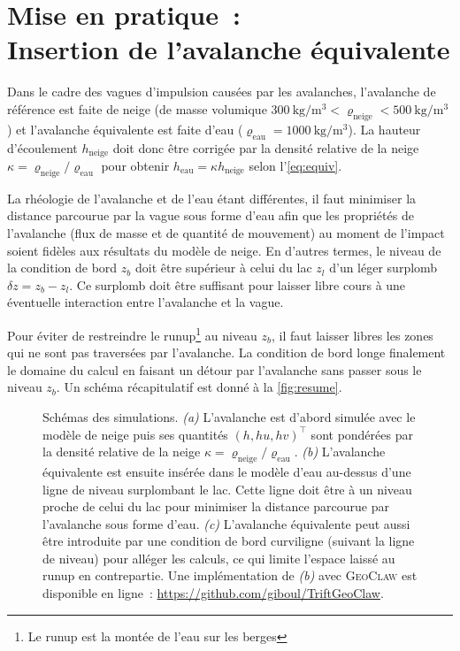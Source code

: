 \section{Mise en pratique~:\\Insertion de l'avalanche équivalente}

Dans le cadre des vagues d'impulsion causées par les avalanches, l'avalanche de référence est faite de neige (de masse volumique $\SI{300}{\kilo\gram\per\meter\cubed}<\varrho_\text{neige}<\SI{500}{\kilo\gram\per\meter\cubed}$) et l'avalanche équivalente est faite d'eau ($\varrho_\text{eau}=\SI{1000}{\kilo\gram\per\meter\cubed}$).
La hauteur d'écoulement $h_\text{neige}$ doit donc être corrigée par la densité relative de la neige $\kappa=\varrho_\text{neige}/\varrho_\text{eau}$ pour obtenir $h_\text{eau}=\kappa h_\text{neige}$ selon l'\autoref{eq:equiv}.

La rhéologie de l'avalanche et de l'eau étant différentes, il faut minimiser la distance parcourue par la vague sous forme d'eau afin que les propriétés de l'avalanche (flux de masse et de quantité de mouvement) au moment de l'impact soient fidèles aux résultats du modèle de neige.
En d'autres termes, le niveau de la condition de bord $z_b$ doit être supérieur à celui du lac $z_l$ d'un léger surplomb $\delta z=z_b-z_l$.
Ce surplomb doit être suffisant pour laisser libre cours à une éventuelle interaction entre l'avalanche et la vague.

Pour éviter de restreindre le runup\footnote{Le runup est la montée de l'eau sur les berges} au niveau $z_b$, il faut laisser libres les zones qui ne sont pas traversées par l'avalanche.
La condition de bord longe finalement le domaine du calcul en faisant un détour par l'avalanche sans passer sous le niveau $z_b$. Un schéma récapitulatif est donné à la \autoref{fig:resume}.

\begin{figure}
    \centering
    
    \caption{Schémas des simulations.
    \textit{(a)} L'avalanche est d'abord simulée avec le modèle de neige puis ses quantités $(h, hu, hv)^\intercal$ sont pondérées par la densité relative de la neige $\kappa=\varrho_\text{neige}/\varrho_\text{eau}$.
    \textit{(b)} L'avalanche équivalente est ensuite insérée dans le modèle d'eau au-dessus d'une ligne de niveau surplombant le lac.
    Cette ligne doit être à un niveau proche de celui du lac pour minimiser la distance parcourue par l'avalanche sous forme d'eau.
    \textit{(c)} L'avalanche équivalente peut aussi être introduite par une condition de bord curviligne (suivant la ligne de niveau) pour alléger les calculs, ce qui limite l'espace laissé au runup en contrepartie.
    Une implémentation de \textit{(b)} avec \textsc{GeoClaw} est disponible en ligne~: \href{https://github.com/giboul/TriftGeoClaw}{https://github.com/giboul/TriftGeoClaw}.}
    \label{fig:resume}
\end{figure}


